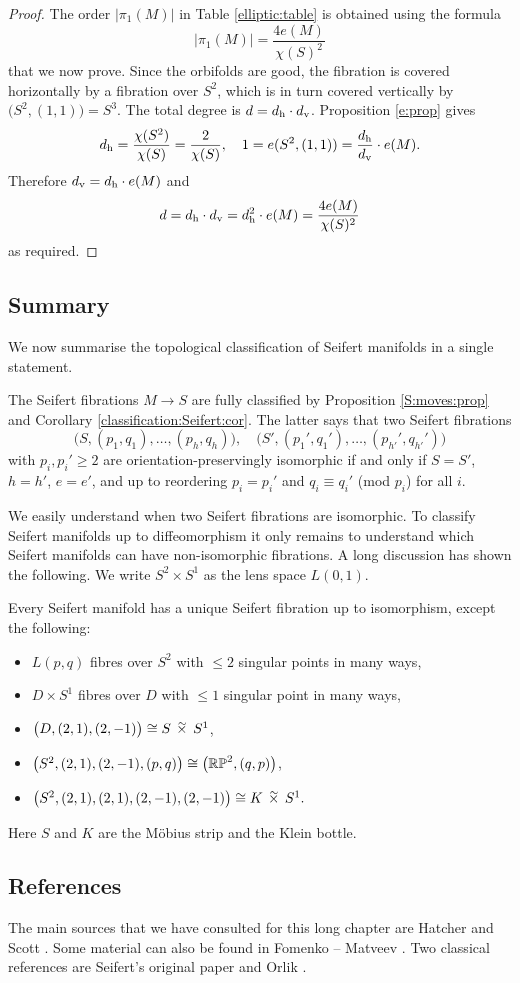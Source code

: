 \begin{proof}
The order $|\pi_1(M)|$ in Table \ref{elliptic:table} is obtained using the formula
$$|\pi_1(M)| = \frac{4e(M)}{\chi(S)^2}$$
that we now prove. Since the orbifolds are good, the fibration is covered horizontally by a fibration over $S^2$, which is in turn covered vertically by $\big(S^2,(1,1)\big) = S^3$. The total degree is $d=d_{\rm h} \cdot d_{\rm v}$. Proposition \ref{e:prop} gives
$$d_{\rm h} = \frac{\chi(S^2)}{\chi(S)} = \frac 2{\chi(S)}, \quad 1=e(S^2,(1,1)) = \frac{d_{\rm h}}{d_{\rm v}} \cdot e(M).$$ 
Therefore $d_{\rm v} = d_{\rm h}\cdot e(M)$ and
$$d = d_{\rm h} \cdot d_{\rm v} = d_{\rm h}^2 \cdot e(M) = \frac{4e(M)}{\chi(S)^2}$$
as required.
\end{proof}

\subsection{Summary} \label{summary:Seifert:subsection}
We now summarise the topological classification of Seifert manifolds in a single statement. 

The Seifert fibrations $M\to S$ are fully classified by Proposition \ref{S:moves:prop} and Corollary \ref{classification:Seifert:cor}. The latter says that two Seifert fibrations
$$\big(S, (p_1,q_1), \ldots, (p_h, q_h)\big), \quad \big(S', (p_1',q_1'), \ldots, (p_{h'}', q_{h'}')\big)$$
with $p_i, p_i'\geqslant 2$ are orientation-preservingly isomorphic if and only if $S=S'$, $h=h'$, $e=e'$, and up to reordering $p_i=p_i'$ and $q_i \equiv q_i'$ (mod $p_i$) for all $i$.

We easily understand when two Seifert fibrations are isomorphic. To classify Seifert manifolds up to diffeomorphism it only remains to understand which Seifert manifolds can have non-isomorphic fibrations. A long discussion has shown the following. We write $S^2\times S^1$ as the lens space $L(0,1)$.

\begin{teo} \label{Seifert:teo}
Every Seifert manifold has a unique Seifert fibration up to isomorphism, except the following:
\begin{itemize}
\item $L(p,q)$ fibres over $S^2$ with $\leqslant 2$ singular points in many ways,
\item $D\times S^1$ fibres over $D$ with $\leqslant 1$ singular point in many ways,
\item $\big( D, (2,1), (2,-1)\big) \isom S\timtil S^1$,
\item $\big(S^2,(2,1),(2,-1),(p,q)\big) \cong \big(\mathbb{RP}^2, (q,p)\big)$, 
\item $\big(S^2,(2,1),(2,1),(2,-1),(2,-1)\big) \isom K\timtil S^1. $
\end{itemize}
Here $S$ and $K$ are the M\"obius strip and the Klein bottle.
\end{teo}

\subsection{References}
The main sources that we have consulted for this long chapter are Hatcher \cite{H} and Scott \cite{S}. Some material can also be found in Fomenko -- Matveev \cite{FM}. Two classical references are Seifert's original paper \cite{Se} and Orlik \cite{O}.
